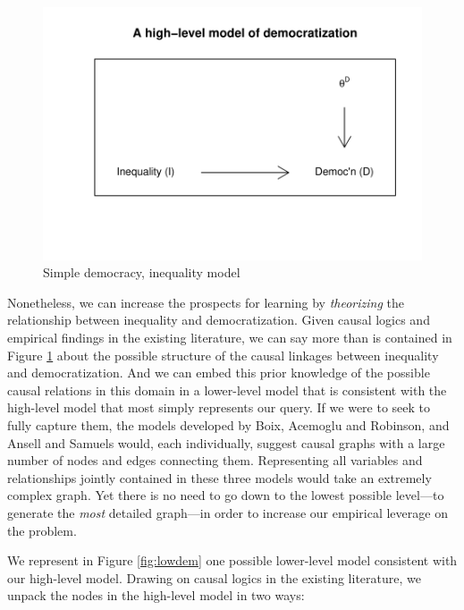 \documentclass[12pt,]{book}
\begin{document}
\begin{figure}

{\centering \includegraphics{ii_files/figure-latex/dagdemochigh-1} 

}

\caption{Simple democracy, inequality model}\label{fig:dagdemochigh}
\end{figure}

Nonetheless, we can increase the prospects for learning by \emph{theorizing} the relationship between inequality and democratization. Given causal logics and empirical findings in the existing literature, we can say more than is contained in Figure \ref{fig:dagdemochigh} about the possible structure of the causal linkages between inequality and democratization. And we can embed this prior knowledge of the possible causal relations in this domain in a lower-level model that is consistent with the high-level model that most simply represents our query. If we were to seek to fully capture them, the models developed by Boix, Acemoglu and Robinson, and Ansell and Samuels would, each individually, suggest causal graphs with a large number of nodes and edges connecting them. Representing all variables and relationships jointly contained in these three models would take an extremely complex graph. Yet there is no need to go down to the lowest possible level---to generate the \emph{most} detailed graph---in order to increase our empirical leverage on the problem.

We represent in Figure \ref{fig:lowdem} one possible lower-level model consistent with our high-level model. Drawing on causal logics in the existing literature, we unpack the nodes in the high-level model in two ways:
\end{document}
